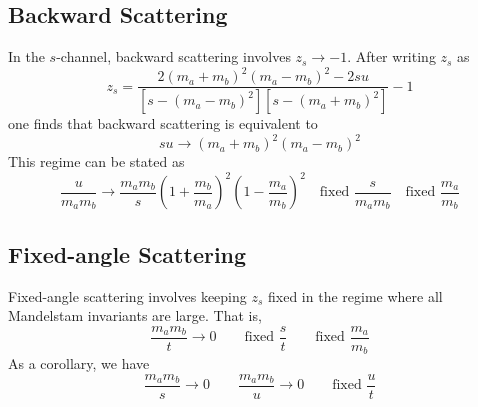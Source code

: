 \subsection{Backward Scattering}
In the $s$-channel, backward scattering involves $z_{s} \rightarrow - 1$. After writing $z_{s}$ as
\begin{equation}
	z_{s} = \frac{2(m_{a} + m_{b})^{2} (m_{a} - m_{b})^{2} - 2 s u}{[s - (m_{a} - m_{b})^{2} ] [s - (m_{a} + m_{b})^{2}]} - 1
\end{equation}
one finds that backward scattering is equivalent to
\begin{equation}
	s u \rightarrow (m_{a} + m_{b})^{2} (m_{a} - m_{b})^{2}
\end{equation}
This regime can be stated as
\begin{equation}
	\frac{u}{m_{a} m_{b}} \rightarrow \frac{m_{a} m_{b}}{s} \left( 1 + \frac{m_{b}}{m_{a}} \right)^{2} \left( 1 - \frac{m_{a}}{m_{b}} \right)^{2} \quad \text{fixed } \frac{s}{m_{a} m_{b}} \quad \text{fixed } \frac{m_{a}}{m_{b}}
\end{equation}
\subsection{Fixed-angle Scattering}
Fixed-angle scattering involves keeping $z_{s}$ fixed in the regime where all Mandelstam invariants are large. That is,
\begin{equation}
	\frac{m_{a} m_{b}}{t} \rightarrow 0 \qquad \text{fixed } \frac{s}{t} \qquad \text{fixed } \frac{m_{a}}{m_{b}}
\end{equation}
As a corollary, we have
\begin{equation}
	\frac{m_{a} m_{b}}{s} \rightarrow 0 \qquad \frac{m_{a} m_{b}}{u} \rightarrow 0 \qquad \text{fixed } \frac{u}{t}
\end{equation}
